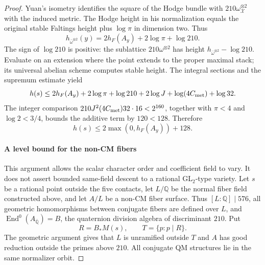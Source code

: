 \begin{proof}
Yuan's isometry \cite[Theorem 1.1 and metric definitions, pp.~2--3]{Yuan2024} identifies the square of the Hodge bundle with
$210\omega_{\mathscr X}^{\otimes2}$ with the induced metric. The Hodge
height in his normalization equals the original stable Faltings height
plus $\log\pi$ in dimension two. Thus
\[
 h_{\bar\omega^{\otimes2}}(y)=2h_F(A_y)+2\log\pi+\log210.
\]
The sign of $\log210$ is positive: the sublattice $210\omega^{\otimes2}$
has height $h_{\bar\omega^{\otimes2}}-\log210$. Evaluate on an extension
where the point extends to the proper maximal stack; its universal
abelian scheme computes stable height. The integral sections and the
supremum estimate yield
\[
 h(s)\le2h_F(A_y)+2\log\pi+\log210+2\log J
                       +\log(4C_{\rm met})+\log32.
\]
The integer comparison
$210J^2(4C_{\rm met})32\cdot16<2^{160}$, together with $\pi<4$ and
$\log2<3/4$, bounds the additive term by $120<128$. Therefore
\[
 h(s)\le2\max(0,h_F(A_y))+128.
\tag{G}\label{eq:h5-G}
\]


\paragraph{A level bound for the non-CM fibers}
\label{sec:h5-level-repair}

This argument allows the scalar character order and coefficient field to
vary. It does not assert bounded same-field descent to a rational
GL$_2$-type variety. Let $s$ be a rational point outside the five contacts,
let $L/\mathbb Q$ be the normal fiber field constructed above, and let
$A/L$ be a non-CM fiber surface. Thus $[L:\mathbb Q]\mid576$, all
geometric homomorphisms between conjugate fibers are defined over $L$,
and $\operatorname{End}^0(A_{\overline{\mathbb Q}})=B$, the quaternion
division algebra of discriminant $210$. Put
\[
 R=B_*M(s),\qquad T=\{p:p\mid R\}.
\]
The geometric argument gives that $L$ is unramified outside $T$ and
$A$ has good reduction outside the primes above $210$. All conjugate
QM structures lie in the same normalizer orbit.


\end{proof}
